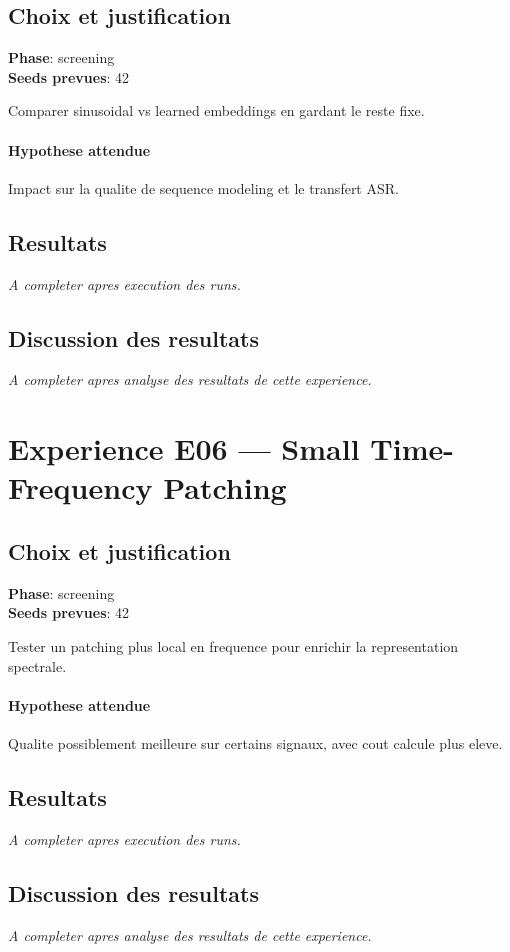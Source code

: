 \documentclass[11pt,a4paper]{article}
\begin{document}
\subsection{Choix et justification}
\textbf{Phase}: screening\\
\textbf{Seeds prevues}: 42

Comparer sinusoidal vs learned embeddings en gardant le reste fixe.

\paragraph{Hypothese attendue}
Impact sur la qualite de sequence modeling et le transfert ASR.

\subsection{Resultats}
\textit{A completer apres execution des runs.}

\subsection{Discussion des resultats}
\textit{A completer apres analyse des resultats de cette experience.}


\section{Experience E06 --- Small Time-Frequency Patching}
\subsection{Choix et justification}
\textbf{Phase}: screening\\
\textbf{Seeds prevues}: 42

Tester un patching plus local en frequence pour enrichir la representation spectrale.

\paragraph{Hypothese attendue}
Qualite possiblement meilleure sur certains signaux, avec cout calcule plus eleve.

\subsection{Resultats}
\textit{A completer apres execution des runs.}

\subsection{Discussion des resultats}
\textit{A completer apres analyse des resultats de cette experience.}
\end{document}
